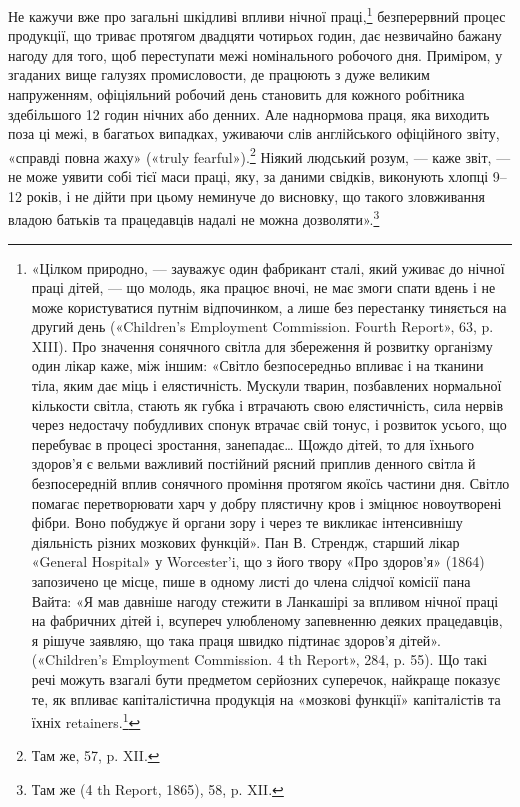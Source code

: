 Не кажучи вже про загальні шкідливі впливи нічної праці,\footnote{
«Цілком природно, — зауважує один фабрикант сталі, який
уживає до нічної праці дітей, — що молодь, яка працює вночі, не має
змоги спати вдень і не може користуватися путнім відпочинком, а лише
без перестанку тиняється на другий день («Children’s Employment Commission.
Fourth Report», 63, p. XIII). Про значення сонячного світла для
збереження й розвитку організму один лікар каже, між іншим: «Світло
безпосередньо впливає і на тканини тіла, яким дає міць і елястичність.
Мускули тварин, позбавлених нормальної кількости світла, стають як губка
і втрачають свою елястичність, сила нервів через недостачу побудливих
спонук втрачає свій тонус, і розвиток усього, що перебуває в процесі
зростання, занепадає\dots{} Щождо дітей, то для їхнього здоров’я є вельми
важливий постійний рясний приплив денного світла й безпосередній вплив
сонячного проміння протягом якоїсь частини дня. Світло помагає перетворювати
харч у добру плястичну кров і зміцнює новоутворені фібри. Воно
побуджує й органи зору і через те викликає інтенсивнішу діяльність різних
мозкових функцій». Пан В. Стрендж, старший лікар «General Hospital»
у Worcester’i, що з його твору «Про здоров’я» (1864) запозичено це
місце, пише в одному листі до члена слідчої комісії пана Вайта: «Я мав
давніше нагоду стежити в Ланкашірі за впливом нічної праці на фабричних
дітей і, всупереч улюбленому запевненню деяких працедавців, я
рішуче заявляю, що така праця швидко підтинає здоров’я дітей». («Children’s
Employment Commission. 4 th Report», 284, p. 55). Що такі речі
можуть взагалі бути предметом серйозних суперечок, найкраще показує
те, як впливає капіталістична продукція на «мозкові функції» капіталістів
та їхніх retainers.\footnote*{
— прихильників. \emph{Ред.}
}
}
безперервний процес продукції, що триває протягом двадцяти чотирьох
годин, дає незвичайно бажану нагоду для того, щоб переступати
межі номінального робочого дня. Приміром, у згаданих
вище галузях промисловости, де працюють з дуже великим напруженням,
офіціяльний робочий день становить для кожного робітника
здебільшого 12 годин нічних або денних. Але наднормова
праця, яка виходить поза ці межі, в багатьох випадках, уживаючи
слів англійського офіційного звіту, «справді повна жаху»
(«truly fearful»).\footnote{
Там же, 57, p. XII.
} Ніякий людський розум, — каже звіт, — не
може уявити собі тієї маси праці, яку, за даними свідків, виконують
хлопці 9--12 років, і не дійти при цьому неминуче
до висновку, що такого зловживання владою батьків та працедавців
надалі не можна дозволяти».\footnote{
Там же (4 th Report, 1865), 58, p. XII.
}

